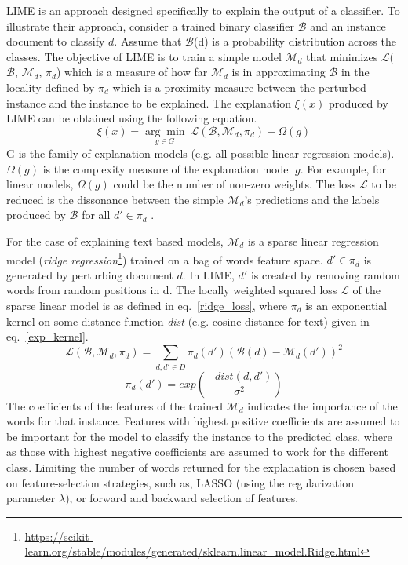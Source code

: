 LIME is an approach designed specifically to explain the output of a classifier. To illustrate their approach, consider a trained binary classifier $\mathcal{B}$ and an instance document to classify $d$. Assume that $\mathcal{B}$(d) is a probability distribution across the classes. The objective of LIME is to train a simple model $\mathcal{M}_d$ that minimizes $\mathcal{L}$($\mathcal{B}$, $\mathcal{M}_d$, $\pi_d$) which is a measure of how far $\mathcal{M}_d$ is in approximating $\mathcal{B}$ in the locality defined by $\pi_d$ which is a proximity measure between the perturbed instance and the instance to be explained. The explanation $\xi(x)$ produced by LIME can be obtained using the following equation.
\begin{equation}
    \xi(x) = \underset{g\in G}{\arg\min}\  \mathcal{L}(\mathcal{B}, \mathcal{M}_d, \pi_d) + \Omega(g)
\end{equation}
G is the family of explanation models (e.g. all possible linear regression models). $\Omega(g)$ is the complexity measure of the explanation model $g$. For example, for linear models, $\Omega(g)$ could be the number of non-zero weights. The loss $\mathcal{L}$ to be reduced is the dissonance between the simple $\mathcal{M}_d$'s predictions and the labels produced by $\mathcal{B}$ for all $d'\in \pi_d$ . 

For the case of explaining text based models, $\mathcal{M}_d$ is a sparse linear regression model (\textit{ridge regression}\footnote{\url{https://scikit-learn.org/stable/modules/generated/sklearn.linear_model.Ridge.html}}) trained on a bag of words feature space. $d' \in \pi_d$ is generated by perturbing document $d$. In LIME, $d'$ is created by removing random words from random positions in d. The locally weighted squared loss $\mathcal{L}$ of the sparse linear model is as defined in eq.~\ref{ridge_loss}, where $\pi_d$ is an exponential kernel on some distance function \textit{dist} (e.g. cosine distance for text) given in eq.~\ref{exp_kernel}.
\begin{equation}\label{ridge_loss}
    \mathcal{L}(\mathcal{B}, \mathcal{M}_d, \pi_d) = \underset{d, d' \in D}{\sum} \pi_d(d')(\mathcal{B}(d) - \mathcal{M}_d(d'))^2
\end{equation}
\begin{equation}\label{exp_kernel}
    \pi_d(d') = exp(\frac{-dist(d, d')}{\sigma^2})
\end{equation}
The coefficients of the features of the trained $\mathcal{M}_d$ indicates the importance of the words for that instance. Features with highest positive coefficients are assumed to be important for the model to classify the instance to the predicted class, where as those with highest negative coefficients are assumed to work for the different class. Limiting the number of words returned for the explanation is chosen based on feature-selection strategies, such as, LASSO (using the regularization parameter $\lambda$), or forward and backward selection of features.

